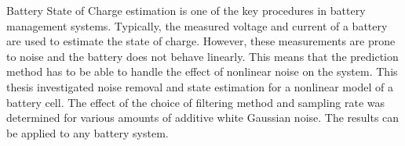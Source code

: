 Battery State of Charge estimation is one of the key procedures in battery management systems. Typically, the measured voltage and current of a battery are used to estimate the state of charge. However, these measurements are prone to noise and the battery does not behave linearly. This means that the prediction method has to be able to handle the effect of nonlinear noise on the system. This thesis investigated noise removal and state estimation for a nonlinear model of a battery cell. The effect of the choice of filtering method and sampling rate was determined for various amounts of additive white Gaussian noise. The results can be applied to any battery system.